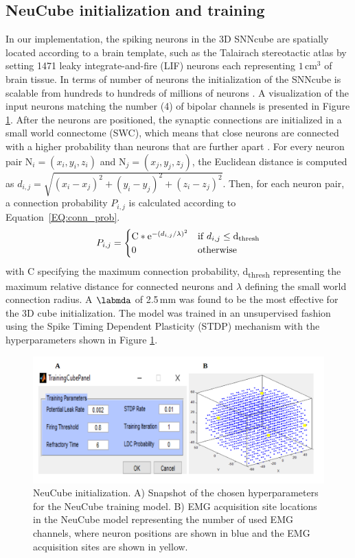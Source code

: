 \documentclass[journal,article,submit,moreauthors,pdftex,10pt,a4paper]{Definitions/mdpi}
\begin{document}
\subsection{NeuCube initialization and training}
In our implementation, the spiking neurons in the 3D SNNcube are spatially located according to a brain template, such as the Talairach stereotactic atlas \cite{38} by setting 1471 leaky integrate-and-fire (LIF) neurons each representing $1\,\text{cm}^3$ of brain tissue. In terms of number of neurons the initialization of the SNNcube is scalable from hundreds to hundreds of millions of neurons \cite{6} . A visualization of the input neurons matching the number (4) of bipolar channels is presented in Figure \ref{FIG:NeuCube_ini.png}. After the neurons are positioned, the synaptic connections are initialized in a small world connectome (SWC), which means that close neurons are connected with a higher probability than neurons that are further apart \cite{6}. For every neuron pair N$_i=(x_i,y_i,z_i)$ and N$_j=(x_j,y_j,z_j)$, the Euclidean distance is computed as $d_{i,j} = \sqrt{(x_i-x_j)^2+(y_i-y_j)^2+(z_i-z_j)^2}$.  Then, for each neuron pair, a connection probability $P_{i,j}$ is calculated according to Equation~\ref{EQ:conn_prob}. 
\begin{equation}
    P_{i,j} = \begin{cases}
    \mathrm{C} * \mathrm{e}^{-(d_{i,j}/\lambda)^2} & \mathrm{if}\; d_{i,j} \leq  \mathrm{d\textsubscript{thresh}}\\
    0 & \mathrm{otherwise}
    \end{cases}
    \label{EQ:conn_prob}
    \end{equation}
with C specifying the maximum connection probability, d\textsubscript{thresh} representing the maximum relative distance for connected neurons and $\lambda$ defining the small world connection radius. A $\labmda$ of 2.5\,mm was found to be the most effective for the 3D cube initialization. The model was trained in an unsupervised fashion using the Spike Timing Dependent Plasticity (STDP) mechanism \cite{39} with the hyperparameters shown in Figure \ref{FIG:NeuCube_ini.png}. 
\begin{figure}[H]
    \centering
    \includegraphics [width=0.8\linewidth]{NeuCube_ini.png}
    \caption{NeuCube initialization. A) Snapshot of the chosen hyperparameters for the NeuCube training model. B) EMG acquisition site locations in the NeuCube model representing the number of used EMG channels, where neuron positions are shown in blue and the EMG acquisition sites are shown in yellow. 
}
    \label{FIG:NeuCube_ini.png}
\end{figure}
\end{document}
